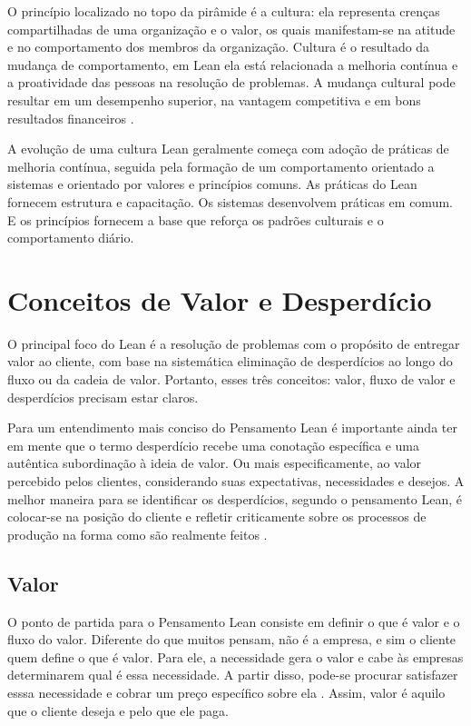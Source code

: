 \begin{anexosenv}
O princípio localizado no topo da pirâmide é a cultura: ela representa crenças compartilhadas de uma organização e o valor,  os quais manifestam-se na atitude e no comportamento dos membros da organização. Cultura é o resultado da mudança de comportamento, em Lean ela está relacionada a melhoria contínua e a proatividade das pessoas na resolução de problemas. A mudança cultural pode resultar em um desempenho superior, na vantagem competitiva e em bons resultados financeiros \cite{bell2011}.

A evolução de uma cultura Lean geralmente começa com adoção de práticas de melhoria contínua, seguida pela formação de um comportamento orientado a sistemas e orientado por valores e princípios comuns. As práticas do Lean fornecem estrutura e capacitação. Os sistemas desenvolvem práticas em comum. E os princípios fornecem a base que reforça os padrões culturais e o comportamento diário.

\section[Conceitos de Valor e Desperdício]{Conceitos de Valor e Desperdício}

O principal foco do Lean é a resolução de problemas com o propósito de entregar valor ao cliente, com base na sistemática eliminação de desperdícios ao longo do fluxo ou da cadeia de valor. Portanto, esses três conceitos: valor, fluxo de valor e desperdícios precisam estar claros.

Para um entendimento mais conciso do Pensamento Lean é importante ainda ter em mente que o termo desperdício recebe uma conotação específica e uma autêntica subordinação à ideia de valor. Ou mais especificamente, ao valor percebido pelos clientes, considerando suas expectativas, necessidades e desejos. A melhor maneira para se identificar os desperdícios, segundo o pensamento Lean, é colocar-se na posição do cliente e refletir criticamente sobre os processos de produção na forma como são realmente feitos \cite{costa2010}.

\subsection[Valor]{Valor}

O ponto de partida para o Pensamento Lean consiste em definir o que é valor e o fluxo do valor. Diferente do que muitos pensam, não é a empresa, e sim o cliente quem define o que é valor. Para ele, a necessidade gera o valor e cabe às empresas determinarem qual é essa necessidade. A partir disso, pode-se procurar satisfazer esssa necessidade e cobrar um preço específico sobre ela \cite{leaninstitute}. Assim, valor é aquilo que o cliente deseja e pelo que ele paga. 


\end{anexosenv}

